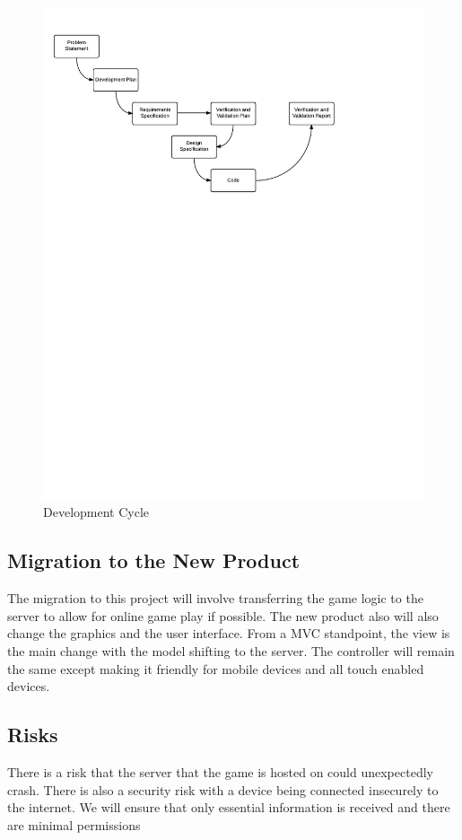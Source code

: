 \documentclass[12pt, titlepage]{article}
\begin{document}
\begin{figure}
  \includegraphics[width=\linewidth]{OverviewOfProcess.pdf}
  \caption{Development Cycle}
  \label{fig:DevelopmentCycle}
\end{figure}

\subsection{Migration to the New Product}
The migration to this project will involve transferring the game logic to the
server to allow for online game play if possible. The new product also will also
change the graphics and the user interface. From a MVC standpoint, the view is
the main change with the model shifting to the server. The controller will
remain the same except making it friendly for mobile devices and all touch
enabled devices.

\subsection{Risks}
There is a risk that the server that the game is hosted on could unexpectedly
crash. There is also a security risk with a device being connected insecurely to
the internet. We will ensure that only essential information is received and
there are minimal permissions
\end{document}
